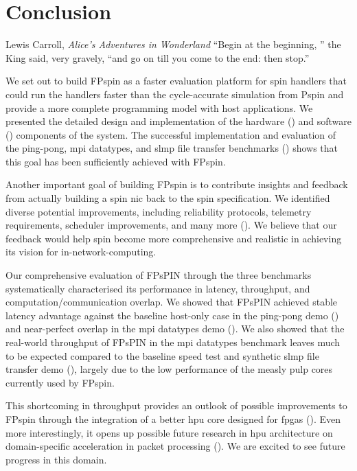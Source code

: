 \chapter{Conclusion}
\begin{chapquote}{Lewis Carroll, \textit{Alice's Adventures in Wonderland}}
``Begin at the beginning, '' the King said, very gravely, ``and go on till you come to the end: then stop.''
\end{chapquote}

We set out to build FP\acs{spin} as a faster evaluation platform for \ac{spin} handlers that could run the handlers faster than the cycle-accurate simulation from P\acs{spin} and provide a more complete programming model with host applications.  We presented the detailed design and implementation of the hardware () and software () components of the system.  The successful implementation and evaluation of the ping-pong, \ac{mpi} datatypes, and \ac{slmp} file transfer benchmarks () shows that this goal has been sufficiently achieved with FP\acs{spin}.

Another important goal of building FP\acs{spin} is to contribute insights and feedback from actually building a \ac{spin} \ac{nic} back to the \ac{spin} specification.  We identified diverse potential improvements, including reliability protocols, telemetry requirements, scheduler improvements, and many more ().  We believe that our feedback would help \ac{spin} become more comprehensive and realistic in achieving its vision for in-network-computing.

Our comprehensive evaluation of FPsPIN through the three benchmarks systematically characterised its performance in latency, throughput, and computation/communication overlap.  We showed that FPsPIN achieved stable latency advantage against the baseline host-only case in the ping-pong demo () and near-perfect overlap in the \ac{mpi} datatypes demo ().  We also showed that the real-world throughput of FPsPIN in the \ac{mpi} datatypes benchmark leaves much to be expected compared to the baseline speed test and synthetic \ac{slmp} file transfer demo (), largely due to the low performance of the measly \ac{pulp} cores currently used by FP\acs{spin}.

This shortcoming in throughput provides an outlook of possible improvements to FP\acs{spin} through the integration of a better \ac{hpu} core designed for \ac{fpga}s ().  Even more interestingly, it opens up possible future research in \ac{hpu} architecture on domain-specific acceleration in packet processing ().  We are excited to see future progress in this domain.
